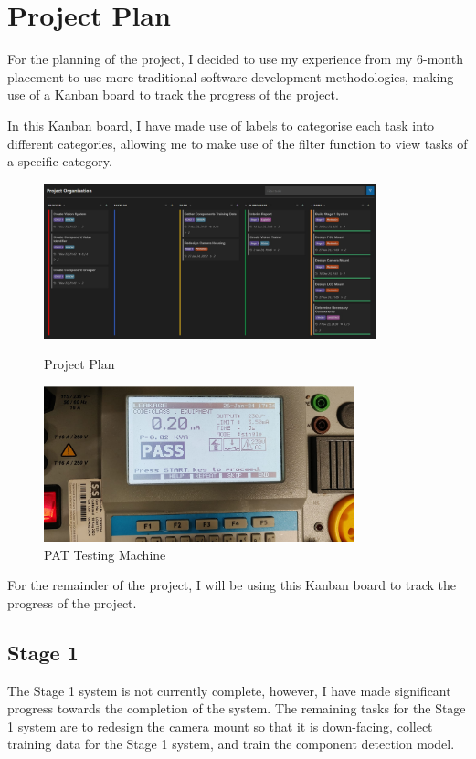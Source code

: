 \section{Project Plan}
\label{sec:projectplan}
For the planning of the project, I decided to use my experience from my 6-month placement to use more traditional software development methodologies,
making use of a Kanban board to track the progress of the project.

In this Kanban board, I have made use of labels to categorise each task into different categories, allowing me to make use
of the filter function to view tasks of a specific category.

\begin{figure}[t]
  \begin{minipage}[t]{0.49\textwidth}
    \centering
    \includegraphics[width=\textwidth,height=4.5cm]{imgs/software/projectplan.jpg}
    \caption{Project Plan}
  \end{minipage}
  \hfill 
  \begin{minipage}[t]{0.49\textwidth}
      \centering
      \includegraphics[width=\textwidth,height=4.5cm]{imgs/pattesting.jpeg}
      \caption{PAT Testing Machine}
      \label{fig:pat}
    \end{minipage}
    \hfill
\end{figure}

For the remainder of the project, I will be using this Kanban board to track the progress of the project. 
 \subsection{Stage 1}
The Stage 1 system is not currently complete, however, I have made significant progress towards the completion of the system. The remaining
tasks for the Stage 1 system are to redesign the camera mount so that it is down-facing, collect training data for the Stage 1 system, and
train the component detection model. 


